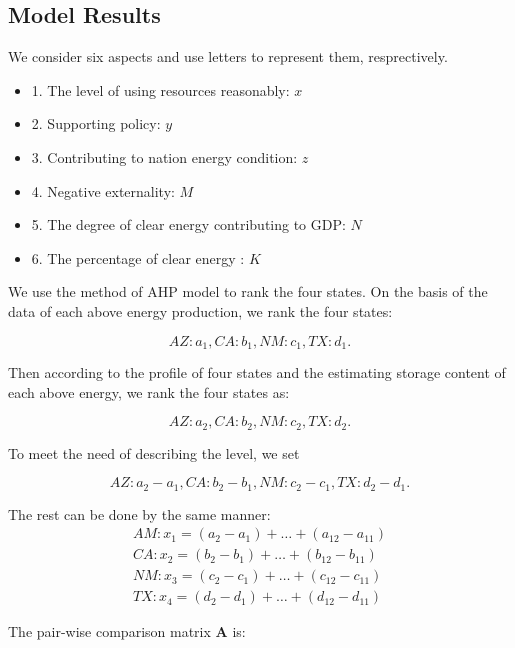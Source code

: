 \documentclass{mcmthesis}
\begin{document}
\subsection{Model Results}

We consider six aspects and use letters to represent them, resprectively.

\begin{itemize}
\item 1. The level of using resources reasonably: $x$ 
\item 2. Supporting policy: $y$
\item 3. Contributing to nation energy condition: $z$
\item 4. Negative externality: $M$
\item 5. The degree of clear energy contributing to GDP: $ N$
\item 6. The percentage of clear energy : $K$
\end{itemize}

We use the method of AHP model to rank the four states. On the basis of the data of each above energy production, we rank the four states:

\begin{equation}\label{14}
AZ: a_1, CA: b_1, NM: c_1, TX: d_1.
\end{equation}

Then according to the profile of four states and the estimating storage content of each above energy, we rank the four states as:

\begin{equation}\label{15}
AZ: a_2, CA: b_2, NM: c_2, TX: d_2.
\end{equation}

 To meet the need of describing the level, we set
 
 \begin{equation}\label{16}
AZ: a_2-a_1, CA: b_2-b_1, NM: c_2-c_1 , TX: d_2-d_1.
\end{equation}

 The rest can be done by the same manner:
\begin{align}
AM: x_1=(a_2-a_1)+\dots+(a_{12}-a_{11})\\
CA: x_2=(b_2-b_1)+\dots+(b_{12}-b_{11})\\
NM: x_3=(c_2-c_1)+\dots+(c_{12}-c_{11})\\
TX: x_4=(d_2-d_1)+\dots+(d_{12}-d_{11})
\end{align}

The pair-wise comparison matrix {\bf{A}} is:
\end{document}
